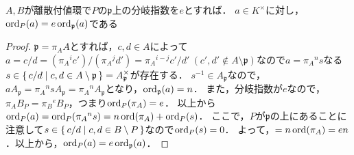 \begin{screen}
  $A, B$が離散付値環で$P$の$\mathfrak{p}$上の分岐指数を$e$とすれば．
  $a\in K^\times$に対し，$\operatorname{ord}_P(a)=e\operatorname{ord}_\mathfrak{p}(a)$である
\end{screen}
\begin{proof}
  $\mathfrak{p}=\pi_AA$とすれば，$c,d\in A$によって$a=c/d=(\pi_A{}^ic')/(\pi_A{}^jd')=\pi_A{}^{i-j}c'/d'\ (c',d'\notin A\setminus\mathfrak{p})$なので$a=\pi_A{}^ns$なる$s\in\set{c/d | c,d\in A\setminus\mathfrak{p}}=A_\mathfrak{p}^\times$が存在する．
  $s^{-1}\in A_\mathfrak{p}$なので，$aA_\mathfrak{p}=\pi_A{}^nsA_\mathfrak{p}=\pi_A{}^nA_\mathfrak{p}$となり，$\operatorname{ord}_\mathfrak{p}(a)=n$．
  また，分岐指数が$e$なので，$\pi_AB_P=\pi_B{}^eB_P$，つまり$\operatorname{ord}_P(\pi_A)=e$．
  以上から$\operatorname{ord}_P(a)=\operatorname{ord}_P(\pi_A{}^ns)=n\operatorname{ord}(\pi_A)+\operatorname{ord}_P(s)$．
  ここで，$P$が$\mathfrak{p}$の上にあることに注意して$s \in \set{c/d | c,d\in B\setminus P}$なので$\operatorname{ord}_P(s)=0$．
  よって，$=n\operatorname{ord}(\pi_A)=en$．以上から，$\operatorname{ord}_P(a)=e\operatorname{ord}_\mathfrak{p}(a)$．
\end{proof}

